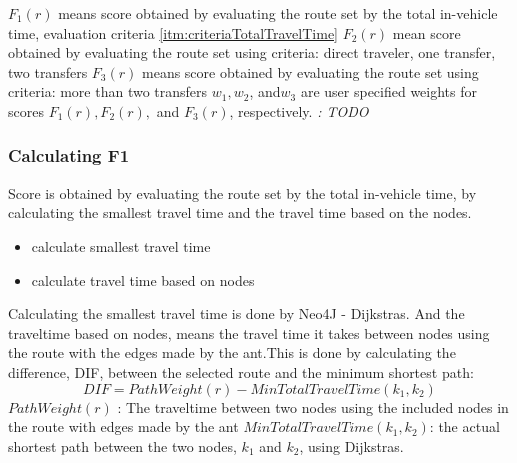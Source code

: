 $ F_{1}(r)$ means score obtained by evaluating the route set by the total in-vehicle time, evaluation criteria \ref{itm:criteriaTotalTravelTime}
\newline
$ F_{2}(r)$ mean score obtained by evaluating the route set using criteria: direct traveler, one transfer, two transfers
\newline
$ F_{3}(r)$ means score obtained by evaluating the route set using criteria: more than two transfers 
\newline
$ w_{1}, w_{2}$, and$ w_{3}$ are user specified weights for scores $ F_{1}(r), F_{2}(r),$ and $ F_{3}(r)$, respectively. \textit{: TODO}

\subsubsection{Calculating F1}
Score is obtained by evaluating the route set by the total in-vehicle time, by calculating the smallest travel time and the travel time based on the nodes.
\begin{itemize}
\item calculate smallest travel time
\item calculate travel time based on nodes
\end{itemize}

Calculating the smallest travel time is done by Neo4J - Dijkstras. 
And the traveltime based on nodes, means the travel time it takes between nodes using the route with the edges made by the ant.This is done by calculating the difference, DIF, between the selected route and the minimum shortest path:
$$ DIF = PathWeight(r) - MinTotalTravelTime(k_{1},k_{2})$$
$ PathWeight(r)$ : The traveltime between two nodes using the included nodes in the route with edges made by the ant
\newline
$ MinTotalTravelTime(k_{1},k_{2})$: the actual shortest path between the two nodes, $k_{1}$ and $k_{2}$, using Dijkstras.




